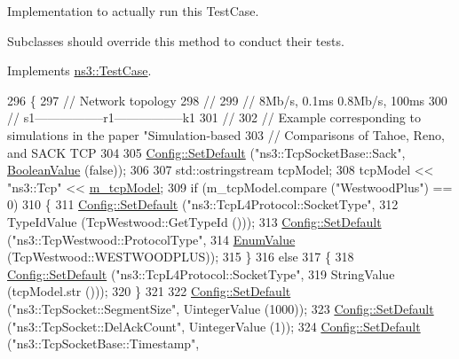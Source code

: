 Implementation to actually run this Test\+Case. 

Subclasses should override this method to conduct their tests. 

Implements \hyperlink{classns3_1_1TestCase_a8ff74680cf017ed42011e4be51917a24}{ns3\+::\+Test\+Case}.


\begin{DoxyCode}
296 \{
297   \textcolor{comment}{// Network topology}
298   \textcolor{comment}{//}
299   \textcolor{comment}{//           8Mb/s, 0.1ms       0.8Mb/s, 100ms}
300   \textcolor{comment}{//       s1-----------------r1-----------------k1}
301   \textcolor{comment}{//}
302   \textcolor{comment}{// Example corresponding to simulations in the paper "Simulation-based}
303   \textcolor{comment}{// Comparisons of Tahoe, Reno, and SACK TCP}
304 
305   \hyperlink{group__config_ga2e7882df849d8ba4aaad31c934c40c06}{Config::SetDefault} (\textcolor{stringliteral}{"ns3::TcpSocketBase::Sack"}, \hyperlink{classns3_1_1BooleanValue}{BooleanValue} (\textcolor{keyword}{false}));
306 
307   std::ostringstream tcpModel;
308   tcpModel << \textcolor{stringliteral}{"ns3::Tcp"} << \hyperlink{classNs3TcpLossTestCase_afbac387ba94a6b5cd8760f688bab5008}{m\_tcpModel};
309   \textcolor{keywordflow}{if} (m\_tcpModel.compare (\textcolor{stringliteral}{"WestwoodPlus"}) == 0)
310     \{
311       \hyperlink{group__config_ga2e7882df849d8ba4aaad31c934c40c06}{Config::SetDefault} (\textcolor{stringliteral}{"ns3::TcpL4Protocol::SocketType"},
312                           TypeIdValue (TcpWestwood::GetTypeId ()));
313       \hyperlink{group__config_ga2e7882df849d8ba4aaad31c934c40c06}{Config::SetDefault} (\textcolor{stringliteral}{"ns3::TcpWestwood::ProtocolType"},
314                           \hyperlink{classns3_1_1EnumValue}{EnumValue} (TcpWestwood::WESTWOODPLUS));
315     \}
316   \textcolor{keywordflow}{else}
317     \{
318       \hyperlink{group__config_ga2e7882df849d8ba4aaad31c934c40c06}{Config::SetDefault} (\textcolor{stringliteral}{"ns3::TcpL4Protocol::SocketType"},
319                           StringValue (tcpModel.str ()));
320     \}
321 
322   \hyperlink{group__config_ga2e7882df849d8ba4aaad31c934c40c06}{Config::SetDefault} (\textcolor{stringliteral}{"ns3::TcpSocket::SegmentSize"}, UintegerValue (1000));
323   \hyperlink{group__config_ga2e7882df849d8ba4aaad31c934c40c06}{Config::SetDefault} (\textcolor{stringliteral}{"ns3::TcpSocket::DelAckCount"}, UintegerValue (1));
324   \hyperlink{group__config_ga2e7882df849d8ba4aaad31c934c40c06}{Config::SetDefault} (\textcolor{stringliteral}{"ns3::TcpSocketBase::Timestamp"}, 

\end{DoxyCode}
